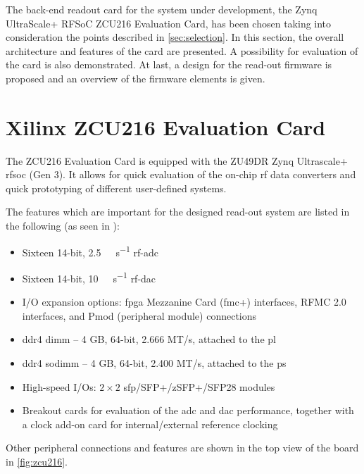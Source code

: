 The back-end readout card for the system under development, the Zynq UltraScale+ RFSoC ZCU216 Evaluation Card, has been chosen taking into consideration the points described in \autoref{sec:selection}.
In this section, the overall architecture and features of the card are presented.
A possibility for evaluation of the card is also demonstrated.
At last, a design for the read-out firmware is proposed and an overview of the firmware elements is given. 

\section{Xilinx ZCU216 Evaluation Card}
The ZCU216 Evaluation Card is equipped with the ZU49DR Zynq Ultrascale+ \gls{rfsoc} (Gen 3). 
It allows for quick evaluation of the on-chip \gls{rf} data converters and quick prototyping of different user-defined systems.

The features which are important for the designed read-out system are listed in the following (as seen in \cite{zcu216}):
\begin{itemize}[noitemsep]
	\item Sixteen 14-bit, \SI{2.5}{\giga \sample \per \second} \gls{rf}-\gls{adc}
	\item Sixteen 14-bit, \SI{10}{\giga \sample \per \second} \gls{rf}-\gls{dac}
	\item I/O expansion options: \gls{fpga} Mezzanine Card (\gls{fmc}+) interfaces, RFMC 2.0 interfaces, and Pmod (peripheral module) connections
	\item \gls{ddr4} \gls{dimm} -- 4 GB, 64-bit, 2.666 MT/s, attached to the \gls{pl}
	\item \gls{ddr4} \gls{sodimm} -- 4 GB, 64-bit, 2.400 MT/s, attached to the \gls{ps}
	\item High-speed I/Os: $2\times2$ \gls{sfp}/SFP+/zSFP+/SFP28 modules
	\item Breakout cards for evaluation of the \gls{adc} and \gls{dac} performance, together with a clock add-on card for internal/external reference clocking
\end{itemize}
Other peripheral connections and features are shown in the top view of the board in \autoref{fig:zcu216}. 

